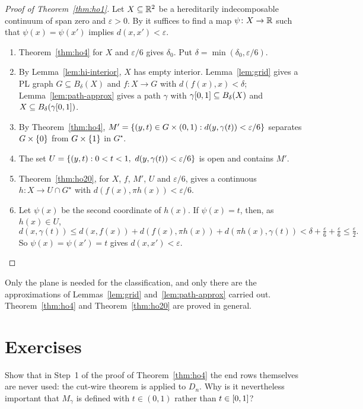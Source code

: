 \begin{proof}[Proof of Theorem~\ref{thm:ho1}]
Let $X\subseteq\mathbb{R}^2$ be a hereditarily indecomposable continuum of span zero and $\varepsilon>0$. By  it suffices to find a map
$\psi\colon X\to\mathbb{R}$ such that $\psi(x)=\psi(x')$ implies $d(x,x')<\varepsilon$.
\begin{enumerate}
\item Theorem~\ref{thm:ho4} for $X$ and $\varepsilon/6$ gives $\delta_0$. Put $\delta=\min(\delta_0,\varepsilon/6)$.
\item By Lemma~\ref{lem:hi-interior}, $X$ has empty interior. Lemma~\ref{lem:grid} gives a PL graph $G\subseteq B_\delta(X)$ and $f\colon X\to G$ with
$d(f(x),x)<\delta$; Lemma~\ref{lem:path-approx} gives a path $\gamma$ with $\gamma[0,1]\subseteq B_\delta(X)$ and $X\subseteq B_\delta(\gamma[0,1])$.
\item By Theorem~\ref{thm:ho4}, $M'=\left\{ (y,t)\in G\times(0,1) : d(y,\gamma(t))<\varepsilon/6 \right\}$ separates $G\times\left\{ 0 \right\}$ from $G\times\left\{ 1 \right\}$ in $G^\star$.
\item The set $U=\set{(y,t) : 0<t<1,\ d(y,\gamma(t))<\varepsilon/6}$ is open and contains $M'$.
\item Theorem~\ref{thm:ho20}, for $X$, $f$, $M'$, $U$ and $\varepsilon/6$, gives a continuous $h\colon X\to U\cap G^\star$ with $d(f(x),\pi h(x))<\varepsilon/6$.
\item Let $\psi(x)$ be the second coordinate of $h(x)$. If $\psi(x)=t$, then, as $h(x)\in U$,
\[
d(x,\gamma(t))\le d(x,f(x))+d(f(x),\pi h(x))+d(\pi h(x),\gamma(t))<\delta+\tfrac\varepsilon6+\tfrac\varepsilon6\le\tfrac\varepsilon2 .
\]
So $\psi(x)=\psi(x')=t$ gives $d(x,x')<\varepsilon$.\qedhere
\end{enumerate}
\end{proof}


Only the plane is needed for the classification, and only there are the approximations of Lemmas~\ref{lem:grid} and~\ref{lem:path-approx} carried
out. Theorem~\ref{thm:ho4} and Theorem~\ref{thm:ho20} are proved in general.

\section*{Exercises}

\begin{exercise}
Show that in Step~1 of the proof of Theorem~\ref{thm:ho4} the end rows themselves are never used: the cut-wire theorem is applied to $D_n$.
Why is it nevertheless important that $M_\gamma$ is defined with $t\in(0,1)$ rather than $t\in[0,1]$?
\end{exercise}

